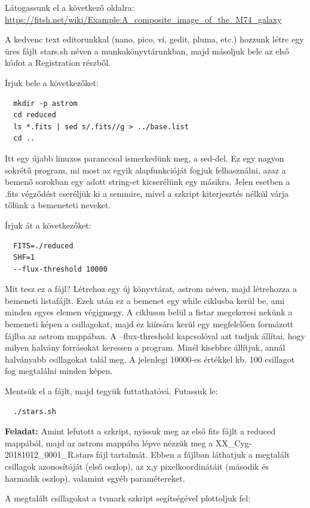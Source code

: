 \documentclass{article}
\begin{document}
Látogassunk el a következő oldalra:
\url{https://fitsh.net/wiki/Example:A_composite_image_of_the_M74_galaxy}

A kedvenc text editorunkkal (nano, pico, vi, gedit, pluma, etc.) hozzunk létre
egy üres fájlt stars.sh néven a munkakönyvtárunkban, majd másoljuk bele az első
kódot a Registration részből.

Írjuk bele a következőket:
\begin{verbatim}
  mkdir -p astrom
  cd reduced
  ls *.fits | sed s/.fits//g > ../base.list
  cd ..
\end{verbatim}

Itt egy újabb linuxos paranccsal ismerkedünk meg, a sed-del. Ez egy nagyon
sokrétű program, mi most az egyik alapfunkcióját fogjuk felhasználni, azaz a
bemenő sorokban egy adott string-et kicserélünk egy másikra. Jelen esetben a
.fits végződést cseréljük ki a semmire, mivel a szkript kiterjesztés nélkül
várja tőlünk a bemeneteti neveket.

Írjuk át a következőket:
\begin{verbatim}
  FITS=./reduced
  SHF=1
  --flux-threshold 10000
\end{verbatim}

Mit tesz ez a fájl? Létrehoz egy új könyvtárat, astrom néven, majd létrehozza a
bemeneti listafájlt. Ezek után ez a bemenet egy while ciklusba kerül be, ami
minden egyes elemen végigmegy. A cikluson belül a fistar megekeresi nekünk a
bemeneti képen a csillagokat, majd ez kiírsára kerül egy megfelelően formázott
fájlba az astrom mappában.
A --flux-threshold kapcsolóval azt tudjuk állítai, hogy milyen halvány
forrásokat keressen a program. Minél kisebbre  állítjuk, annál halványabb
csillagokat talál meg. A jelenlegi 10000-es értékkel kb. 100 csillagot fog
megtalálni minden képen.

Mentsük el a fájlt, majd tegyük futtathatóvá. Futassuk le:

\begin{verbatim}
  ./stars.sh
\end{verbatim}

{\bf Feladat:}
Amint lefutott a szkript, nyissuk meg az első fits fájlt a reduced mappából,
majd az astrom mappába lépve nézzük meg a XX\_Cyg-20181012\_0001\_R.stars fájl
tartalmát. Ebben a fájlban láthatjuk a megtalált csillagok azonosítóját (első
oszlop), az x,y pixelkoordinátáit (második és harmadik oszlop), valamint
egyéb paramétereket.

A megtalált csillagokat a tvmark szkript segítségével plottoljuk fel:
\end{document}
